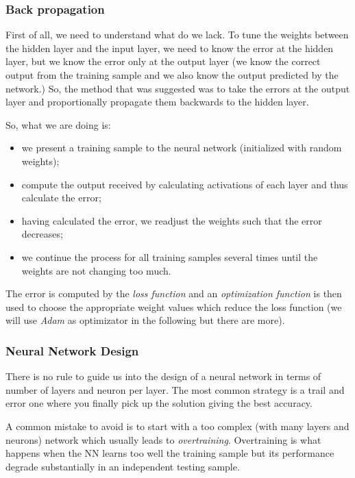 \documentclass[11pt]{article}
\providecommand{\tightlist}{%
      \setlength{\itemsep}{0pt}\setlength{\parskip}{0pt}}
\begin{document}
\hypertarget{back-propagation}{%
\subsubsection{Back propagation}\label{back-propagation}}

First of all, we need to understand what do we lack. To tune the weights
between the hidden layer and the input layer, we need to know the error
at the hidden layer, but we know the error only at the output layer (we
know the correct output from the training sample and we also know the
output predicted by the network.) So, the method that was suggested was
to take the errors at the output layer and proportionally propagate them
backwards to the hidden layer.

So, what we are doing is:

\begin{itemize}
\tightlist
\item
  we present a training sample to the neural network (initialized with
  random weights);
\item
  compute the output received by calculating activations of each layer
  and thus calculate the error;
\item
  having calculated the error, we readjust the weights such that the
  error decreases;
\item
  we continue the process for all training samples several times until
  the weights are not changing too much.
\end{itemize}

The error is computed by the \emph{loss function} and an \emph{optimization function}
is then used to choose the appropriate weight values which reduce the loss function
(we will use \emph{Adam} as optimizator in the following but there are more).

\subsubsection{Neural Network Design}

There is no rule to guide us into the design of a neural network in terms
of number of layers and neuron per layer. The most common strategy is a
trail and error one where you finally pick up the solution giving the best accuracy.

A common mistake to avoid is to start with a too complex
(with many layers and neurons) network which usually leads to \emph{overtraining}.
Overtraining is what happens when the NN learns too well the training sample
but its performance degrade substantially in an independent testing sample.
\end{document}
